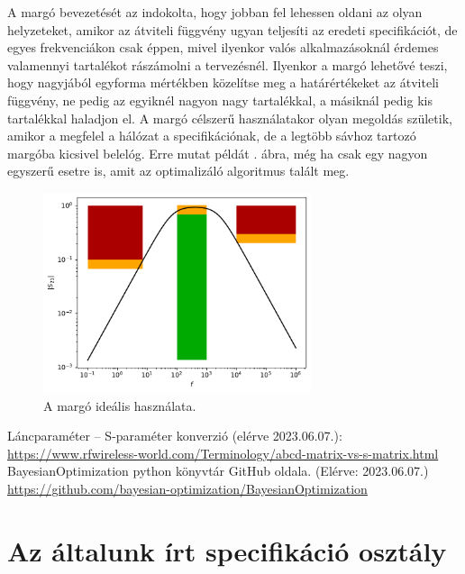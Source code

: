         A margó bevezetését az indokolta, hogy jobban fel lehessen oldani az olyan helyzeteket, amikor az átviteli függvény ugyan teljesíti az eredeti specifikációt, de egyes frekvenciákon csak éppen, mivel ilyenkor valós alkalmazásoknál érdemes valamennyi tartalékot rászámolni a tervezésnél. Ilyenkor a margó lehetővé teszi, hogy nagyjából egyforma mértékben közelítse meg a határértékeket az átviteli függvény, ne pedig az egyiknél nagyon nagy tartalékkal, a másiknál pedig kis tartalékkal haladjon el. A margó célszerű használatakor olyan megoldás születik, amikor a megfelel a hálózat a specifikációnak, de a legtöbb sávhoz tartozó margóba kicsivel belelóg. Erre mutat példát . ábra, még ha csak egy nagyon egyszerű esetre is, amit az optimalizáló algoritmus talált meg.
        \begin{figure}[h!]
            \centering
            \includegraphics[width=0.7\textwidth]{megoldas.pdf}
            \caption{A margó ideális használata.}
            \label{fig:megoldas}
        \end{figure}
%
\clearpage
\begin{thebibliography}{9}
     Láncparaméter -- S-paraméter konverzió (elérve 2023.06.07.): \url{https://www.rfwireless-world.com/Terminology/abcd-matrix-vs-s-matrix.html}
     BayesianOptimization python könyvtár GitHub oldala. (Elérve: 2023.06.07.) \url{https://github.com/bayesian-optimization/BayesianOptimization}
\end{thebibliography}

\clearpage
\appendix
\section{Az általunk írt specifikáció osztály}
	

